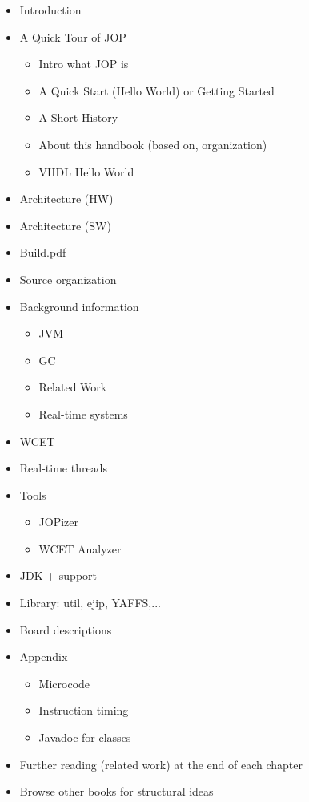 \begin{itemize}
    \item Introduction
    \item A Quick Tour of JOP

    \begin{itemize}
        \item Intro what JOP is
        \item A Quick Start (Hello World) or Getting Started
        \item A Short History
        \item About this handbook (based on, organization)
        \item VHDL Hello World
    \end{itemize}
    \item Architecture (HW)
    \item Architecture (SW)
    \item Build.pdf
    \item Source organization
    \item Background information
    \begin{itemize}
        \item JVM
        \item GC
        \item Related Work
        \item Real-time systems
    \end{itemize}
    \item WCET
    \item Real-time threads
    \item Tools
    \begin{itemize}
        \item JOPizer
        \item WCET Analyzer
    \end{itemize}
    \item JDK + support
    \item Library: util, ejip, YAFFS,...
    \item Board descriptions
    \item Appendix
    \begin{itemize}
        \item Microcode
        \item Instruction timing
        \item Javadoc for classes
    \end{itemize}
    \item Further reading (related work) at the end of each chapter
    \item Browse other books for structural ideas
\end{itemize}

